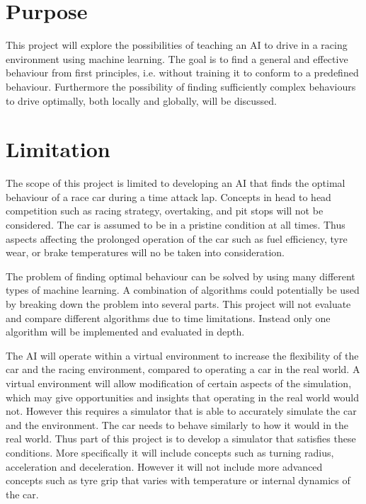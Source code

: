 \section{Purpose}
This project will explore the possibilities of teaching an AI to drive in a racing environment using machine learning. The goal is to find a general and effective behaviour from first principles, i.e. without training it to conform to a predefined behaviour. Furthermore the possibility of finding sufficiently complex behaviours to drive optimally, both locally and globally, will be discussed. 

\section{Limitation}

The scope of this project is limited to developing an AI that finds the optimal behaviour of a race car during a time attack lap. Concepts in head to head competition such as racing strategy, overtaking, and pit stops will not be considered. The car is assumed to be in a pristine condition at all times. Thus aspects affecting the prolonged operation of the car such as fuel efficiency, tyre wear, or brake temperatures will no be taken into consideration. 

The problem of finding optimal behaviour can be solved by using many different types of machine learning. A combination of algorithms could potentially be used by breaking down the problem into several parts. This project will not evaluate and compare different algorithms due to time limitations. Instead only one algorithm will be implemented and evaluated in depth. 

The AI will operate within a virtual environment to increase the flexibility of the car and the racing environment, compared to operating a car in the real world. A virtual environment will allow modification of certain aspects of the simulation, which may give opportunities and insights that operating in the real world would not. However this requires a simulator that is able to accurately simulate the car and the environment. The car needs to behave similarly to how it would in the real world. Thus part of this project is to develop a simulator that satisfies these conditions. More specifically it will include concepts such as turning radius, acceleration and deceleration. However it will not include more advanced concepts such as tyre grip that varies with temperature or internal dynamics of the car.

